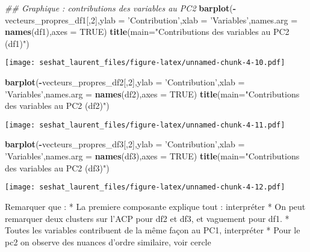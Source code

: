\documentclass[
]{article}
\newenvironment{Shaded}{\begin{snugshade}}{\end{snugshade}}
\newcommand{\CommentTok}[1]{\textcolor[rgb]{0.56,0.35,0.01}{\textit{#1}}}
\newcommand{\DataTypeTok}[1]{\textcolor[rgb]{0.13,0.29,0.53}{#1}}
\newcommand{\DecValTok}[1]{\textcolor[rgb]{0.00,0.00,0.81}{#1}}
\newcommand{\KeywordTok}[1]{\textcolor[rgb]{0.13,0.29,0.53}{\textbf{#1}}}
\newcommand{\NormalTok}[1]{#1}
\newcommand{\OperatorTok}[1]{\textcolor[rgb]{0.81,0.36,0.00}{\textbf{#1}}}
\newcommand{\OtherTok}[1]{\textcolor[rgb]{0.56,0.35,0.01}{#1}}
\newcommand{\StringTok}[1]{\textcolor[rgb]{0.31,0.60,0.02}{#1}}
\begin{document}
\begin{Shaded}
\begin{Highlighting}[]
\CommentTok{## Graphique : contributions des variables au PC2}
\KeywordTok{barplot}\NormalTok{(}\OperatorTok{-}\NormalTok{vecteurs_propres_df1[,}\DecValTok{2}\NormalTok{],}\DataTypeTok{ylab =} \StringTok{'Contribution'}\NormalTok{,}\DataTypeTok{xlab =} \StringTok{'Variables'}\NormalTok{,}\DataTypeTok{names.arg =} \KeywordTok{names}\NormalTok{(df1),}\DataTypeTok{axes =} \OtherTok{TRUE}\NormalTok{)}
\KeywordTok{title}\NormalTok{(}\DataTypeTok{main=}\StringTok{"Contributions des variables au PC2 (df1)"}\NormalTok{)}
\end{Highlighting}
\end{Shaded}

\texttt{[image: seshat\_laurent\_files/figure-latex/unnamed-chunk-4-10.pdf]}

\begin{Shaded}
\begin{Highlighting}[]
\KeywordTok{barplot}\NormalTok{(}\OperatorTok{-}\NormalTok{vecteurs_propres_df2[,}\DecValTok{2}\NormalTok{],}\DataTypeTok{ylab =} \StringTok{'Contribution'}\NormalTok{,}\DataTypeTok{xlab =} \StringTok{'Variables'}\NormalTok{,}\DataTypeTok{names.arg =} \KeywordTok{names}\NormalTok{(df2),}\DataTypeTok{axes =} \OtherTok{TRUE}\NormalTok{)}
\KeywordTok{title}\NormalTok{(}\DataTypeTok{main=}\StringTok{"Contributions des variables au PC2 (df2)"}\NormalTok{)}
\end{Highlighting}
\end{Shaded}

\texttt{[image: seshat\_laurent\_files/figure-latex/unnamed-chunk-4-11.pdf]}

\begin{Shaded}
\begin{Highlighting}[]
\KeywordTok{barplot}\NormalTok{(}\OperatorTok{-}\NormalTok{vecteurs_propres_df3[,}\DecValTok{2}\NormalTok{],}\DataTypeTok{ylab =} \StringTok{'Contribution'}\NormalTok{,}\DataTypeTok{xlab =} \StringTok{'Variables'}\NormalTok{,}\DataTypeTok{names.arg =} \KeywordTok{names}\NormalTok{(df3),}\DataTypeTok{axes =} \OtherTok{TRUE}\NormalTok{)}
\KeywordTok{title}\NormalTok{(}\DataTypeTok{main=}\StringTok{"Contributions des variables au PC2 (df3)"}\NormalTok{)}
\end{Highlighting}
\end{Shaded}

\texttt{[image: seshat\_laurent\_files/figure-latex/unnamed-chunk-4-12.pdf]}

Remarquer que : * La premiere composante explique tout : interpréter *
On peut remarquer deux clusters sur l'ACP pour df2 et df3, et vaguement
pour df1. * Toutes les variables contribuent de la même façon au PC1,
interpréter * Pour le pc2 on observe des nuances d'ordre similaire, voir
cercle
\end{document}
